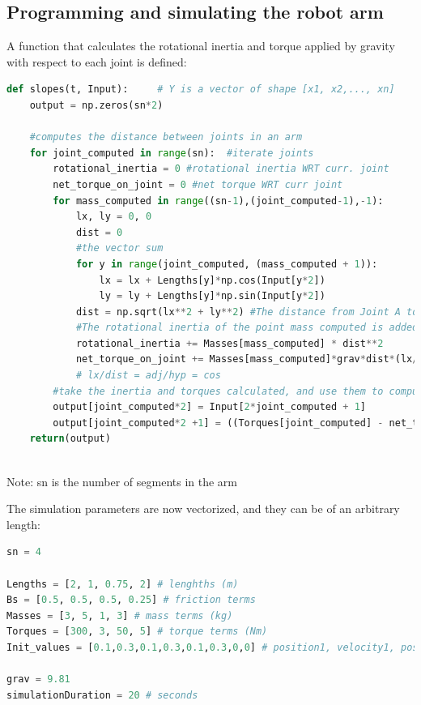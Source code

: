\documentclass{article}
\begin{document}
\vspace{24pt}

\newpage

\subsection{Programming and simulating the robot arm}

\noindent \justifying A function that calculates the rotational inertia and torque applied by gravity with respect to each joint is defined:
\vspace{24pt}
\begin{lstlisting}[language=Python]
def slopes(t, Input):     # Y is a vector of shape [x1, x2,..., xn]
    output = np.zeros(sn*2)

    #computes the distance between joints in an arm
    for joint_computed in range(sn):  #iterate joints
        rotational_inertia = 0 #rotational inertia WRT curr. joint
        net_torque_on_joint = 0 #net torque WRT curr joint
        for mass_computed in range((sn-1),(joint_computed-1),-1):
            lx, ly = 0, 0
            dist = 0
            #the vector sum
            for y in range(joint_computed, (mass_computed + 1)):
                lx = lx + Lengths[y]*np.cos(Input[y*2])
                ly = ly + Lengths[y]*np.sin(Input[y*2])
            dist = np.sqrt(lx**2 + ly**2) #The distance from Joint A to B   
            #The rotational inertia of the point mass computed is added to the system:
            rotational_inertia += Masses[mass_computed] * dist**2 
            net_torque_on_joint += Masses[mass_computed]*grav*dist*(lx/dist) 
            # lx/dist = adj/hyp = cos
        #take the inertia and torques calculated, and use them to compute the ODE:
        output[joint_computed*2] = Input[2*joint_computed + 1]
        output[joint_computed*2 +1] = ((Torques[joint_computed] - net_torque_on_joint) / rotational_inertia)  - Bs[joint_computed]*Input[2*joint_computed + 1] #x2'
    return(output)
    
\end{lstlisting}
Note: sn is the number of segments in the arm

\newpage

\vspace{24pt}
\noindent \justifying The simulation parameters are now vectorized, and they can be of an arbitrary length:
\vspace{24pt}

\begin{lstlisting}[language=Python]
sn = 4

Lengths = [2, 1, 0.75, 2] # lenghths (m)
Bs = [0.5, 0.5, 0.5, 0.25] # friction terms 
Masses = [3, 5, 1, 3] # mass terms (kg)
Torques = [300, 3, 50, 5] # torque terms (Nm)
Init_values = [0.1,0.3,0.1,0.3,0.1,0.3,0,0] # position1, velocity1, position2, velocity2, ....., positionn, velocityn

grav = 9.81
simulationDuration = 20 # seconds
\end{lstlisting}
\end{document}
